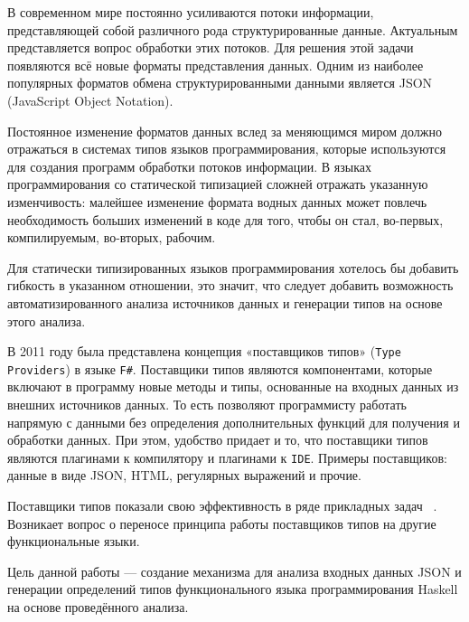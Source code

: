 


\graphicspath{ {img/} }




\Intro
В современном мире постоянно усиливаются потоки информации, представляющей собой различного рода структурированные данные. Актуальным представляется вопрос обработки этих потоков. Для решения этой задачи появляются всё новые форматы представления данных. Одним из наиболее популярных форматов обмена структурированными данными является JSON (JavaScript Object Notation).

Постоянное изменение форматов данных вслед за меняющимся миром должно отражаться в системах типов языков программирования, которые используются для создания программ обработки потоков информации. В языках программирования со статической типизацией сложней отражать указанную изменчивость: малейшее изменение формата водных данных может повлечь необходимость больших изменений в коде для того, чтобы он стал, во-первых, компилируемым, во-вторых, рабочим.

Для статически типизированных языков программирования хотелось бы добавить гибкость в указанном отношении, это значит, что следует добавить возможность автоматизированного анализа источников данных и генерации типов на основе этого анализа. 

В 2011 году была представлена концепция «поставщиков типов» (\lstinline{Type Providers}) в языке \lstinline{F#}. Поставщики типов являются компонентами, которые включают в программу новые методы и типы, основанные на входных данных из внешних источников данных. То есть позволяют программисту работать напрямую с данными без определения дополнительных функций для получения и обработки данных. При этом, удобство придает и то, что поставщики типов являются плагинами к компилятору и плагинами к \lstinline{IDE}. Примеры поставщиков: данные в виде JSON, HTML, регулярных выражений и прочие.

Поставщики типов показали свою эффективность в ряде прикладных задач ~\cite{typo}. Возникает вопрос о переносе принципа работы поставщиков типов на другие функциональные языки.

Цель данной работы --- создание механизма для анализа входных данных JSON и генерации определений типов функционального языка программирования Haskell на основе проведённого анализа.

